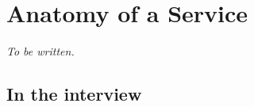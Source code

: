 \chapter{Anatomy of a Service}
\label{ch:service}


\emph{To be written.}

\section*{In the interview}

